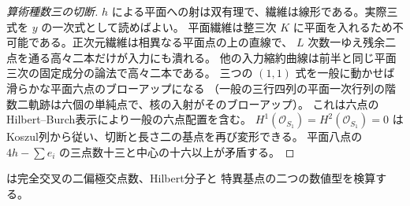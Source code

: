\begin{proof}[算術種数三の切断]
$h$ による平面への射は双有理で、繊維は線形である。実際三式を $y$ の一次式として読めばよい。
平面繊維は整三次 $K$ に平面を入れるため不可能である。正次元繊維は相異なる平面点の上の直線で、
$L$ 次数一ゆえ残余二点を通る高々二本だけが入力にも潰れる。
他の入力縮約曲線は前半と同じ平面三次の固定成分の論法で高々二本である。
三つの $(1,1)$ 式を一般に動かせば滑らかな平面六点のブローアップになる
（一般の三行四列の平面一次行列の階数二軌跡は六個の単純点で、核の入射がそのブローアップ）。
これは六点のHilbert--Burch表示により一般の六点配置を含む。
$H^1(\mathcal O_{S_1})=H^2(\mathcal O_{S_1})=0$ はKoszul列から従い、切断と長さ二の基点を再び変形できる。
平面八点の $4h-\sum e_i$ の三点数十三と中心の十六以上が矛盾する。
\end{proof}
 は完全交叉の二偏極交点数、Hilbert分子と
特異基点の二つの数値型を検算する。
